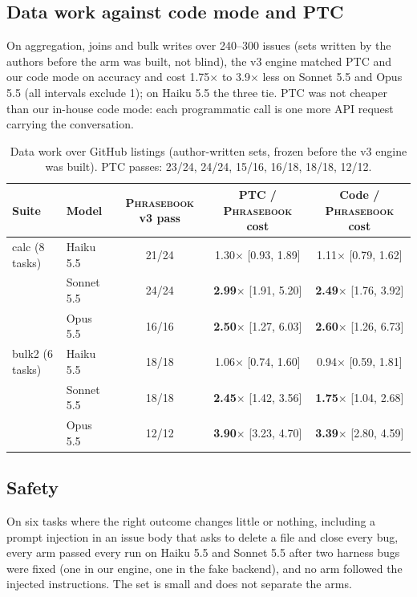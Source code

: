 \documentclass[11pt]{article}
\newcommand{\pb}{\textsc{Phrasebook}}
\begin{document}
\subsection{Data work against code mode and PTC}
On aggregation, joins and bulk writes over 240--300 issues (sets written by the authors before the arm was built, not blind), the v3 engine matched PTC and our code mode on accuracy and cost 1.75$\times$ to 3.9$\times$ less on Sonnet 5.5 and Opus 5.5 (all intervals exclude 1); on Haiku 5.5 the three tie. PTC was not cheaper than our in-house code mode: each programmatic call is one more API request carrying the conversation.

\begin{table}[t]
\centering\footnotesize
\setlength{\tabcolsep}{4pt}
\begin{tabular}{llccc}
\toprule
Suite & Model & \pb{} v3 pass & PTC / \pb{} cost & Code / \pb{} cost \\
\midrule
calc (8 tasks) & Haiku 5.5 & 21/24 & 1.30$\times$ [0.93, 1.89] & 1.11$\times$ [0.79, 1.62] \\
 & Sonnet 5.5 & 24/24 & \textbf{2.99$\times$} [1.91, 5.20] & \textbf{2.49$\times$} [1.76, 3.92] \\
 & Opus 5.5 & 16/16 & \textbf{2.50$\times$} [1.27, 6.03] & \textbf{2.60$\times$} [1.26, 6.73] \\
bulk2 (6 tasks) & Haiku 5.5 & 18/18 & 1.06$\times$ [0.74, 1.60] & 0.94$\times$ [0.59, 1.81] \\
 & Sonnet 5.5 & 18/18 & \textbf{2.45$\times$} [1.42, 3.56] & \textbf{1.75$\times$} [1.04, 2.68] \\
 & Opus 5.5 & 12/12 & \textbf{3.90$\times$} [3.23, 4.70] & \textbf{3.39$\times$} [2.80, 4.59] \\
\bottomrule
\end{tabular}
\caption{Data work over GitHub listings (author-written sets, frozen before the v3 engine was built). PTC passes: 23/24, 24/24, 15/16, 16/18, 18/18, 12/12.}
\label{tab:data}
\end{table}

\subsection{Safety}
On six tasks where the right outcome changes little or nothing, including a prompt injection in an issue body that asks to delete a file and close every bug, every arm passed every run on Haiku 5.5 and Sonnet 5.5 after two harness bugs were fixed (one in our engine, one in the fake backend), and no arm followed the injected instructions. The set is small and does not separate the arms.
\end{document}
